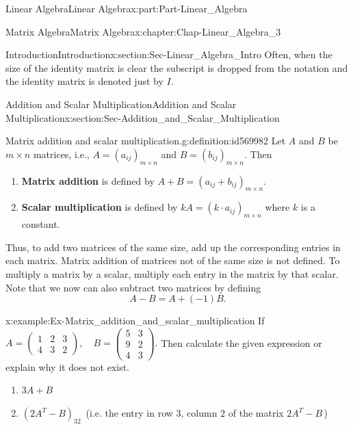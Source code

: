 \documentclass[oneside,10pt,]{book}
\newcommand{\terminology}[1]{\textbf{#1}}
\numberwithin{equation}{section}
\newcommand{\amp}{&}
\begin{document}
\begin{partptx}{Linear Algebra}{}{Linear Algebra}{}{}{x:part:Part-Linear_Algebra}
\begin{chapterptx}{Matrix Algebra}{}{Matrix Algebra}{}{}{x:chapter:Chap-Linear_Algebra_3}
\begin{sectionptx}{Introduction}{}{Introduction}{}{}{x:section:Sec-Linear_Algebra_Intro}
Often, when the size of the identity matrix is clear the subscript is dropped from the notation and the identity matrix is denoted just by \(I\).%
\end{sectionptx}
%
%
\typeout{************************************************}
\typeout{************************************************}
%
\begin{sectionptx}{Addition and Scalar Multiplication}{}{Addition and Scalar Multiplication}{}{}{x:section:Sec-Addition_and_Scalar_Multiplication}
\begin{definition}{Matrix addition and scalar multiplication.}{g:definition:id569982}%
Let \(A\) and \(B\) be \(m \times n\) matrices, i.e., \(A=\left(a_{ij}\right)_{m \times n}\) and \(B = \left(b_{ij}\right)_{m \times n}\). Then %
\begin{enumerate}[label=\roman*]
\item{}\terminology{Matrix addition} is defined by \(A+B = \left(a_{ij} + b_{ij}\right)_{m \times n}\).%
\item{}\terminology{Scalar multiplication} is defined by \(kA = \left(k \cdot a_{ij}\right)_{m \times n}\) where \(k\) is a constant.%
\end{enumerate}
\end{definition}
Thus, to add two matrices of the same size, add up the corresponding entries in each matrix. Matrix addition of matrices not of the same size is not defined. To multiply a matrix by a scalar, multiply each entry in the matrix by that scalar. Note that we now can also subtract two matrices by defining%
\begin{equation*}
A-B = A+ (-1)B.
\end{equation*}
%
\begin{example}{}{x:example:Ex-Matrix_addition_and_scalar_multiplication}%
If \(A = \begin{pmatrix} 1 \amp 2 \amp 3\\ 4 \amp 3 \amp 2\end{pmatrix}, \quad B = \begin{pmatrix} 5 \amp 3 \\ 9 \amp 2 \\ 4 \amp 3\end{pmatrix}.\) Then calculate the given expression or explain why it does not exist.%
\begin{enumerate}[label=\alph*]
\item{}\(\displaystyle 3A+B\)%
\item{}\((2A^T - B)_{32} \, \) (i.e. the entry in row \(3\), column \(2\) of the matrix \(2A^T-B\,\))%

\end{enumerate}
\end{example}
\end{sectionptx}
\end{chapterptx}
\end{partptx}
\end{document}
